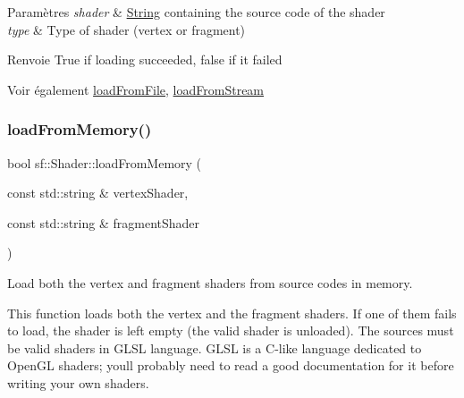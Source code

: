 \begin{DoxyParams}{Paramètres}
{\em shader} & \hyperlink{classsf_1_1String}{String} containing the source code of the shader \\
\hline
{\em type} & Type of shader (vertex or fragment)\\
\hline
\end{DoxyParams}
\begin{DoxyReturn}{Renvoie}
True if loading succeeded, false if it failed
\end{DoxyReturn}
\begin{DoxySeeAlso}{Voir également}
\hyperlink{classsf_1_1Shader_a053a5632848ebaca2fcd8ba29abe9e6e}{load\+From\+File}, \hyperlink{classsf_1_1Shader_a2ee1b130c0606e4f8bcdf65c1efc2a53}{load\+From\+Stream} 
\end{DoxySeeAlso}
\mbox{\label{classsf_1_1Shader_ae34e94070d7547a890166b7993658a9b}} 
\subsubsection{\texorpdfstring{load\+From\+Memory()}{loadFromMemory()}\hspace{0.1cm}{\footnotesize\ttfamily [2/2]}}
{\footnotesize\ttfamily bool sf\+::\+Shader\+::load\+From\+Memory (\begin{DoxyParamCaption}\item[{const std\+::string \&}]{vertex\+Shader,  }\item[{const std\+::string \&}]{fragment\+Shader }\end{DoxyParamCaption})}



Load both the vertex and fragment shaders from source codes in memory. 

This function loads both the vertex and the fragment shaders. If one of them fails to load, the shader is left empty (the valid shader is unloaded). The sources must be valid shaders in G\+L\+SL language. G\+L\+SL is a C-\/like language dedicated to Open\+GL shaders; you\textquotesingle{}ll probably need to read a good documentation for it before writing your own shaders.


